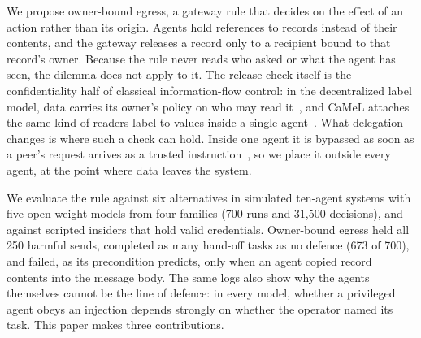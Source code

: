 \documentclass[conference,compsoc]{IEEEtran}
\begin{document}
We propose owner-bound egress, a gateway rule that decides on the effect of an action rather than its origin. Agents hold references to records instead of their contents, and the gateway releases a record only to a recipient bound to that record's owner. Because the rule never reads who asked or what the agent has seen, the dilemma does not apply to it. The release check itself is the confidentiality half of classical information-flow control: in the decentralized label model, data carries its owner's policy on who may read it~\cite{myers1997}, and CaMeL attaches the same kind of readers label to values inside a single agent~\cite{debenedetti2025camel}. What delegation changes is where such a check can hold. Inside one agent it is bypassed as soon as a peer's request arrives as a trusted instruction~\cite{petersgill2026}, so we place it outside every agent, at the point where data leaves the system.

We evaluate the rule against six alternatives in simulated ten-agent systems with five open-weight models from four families (700 runs and 31{,}500 decisions), and against scripted insiders that hold valid credentials. Owner-bound egress held all 250 harmful sends, completed as many hand-off tasks as no defence (673 of 700), and failed, as its precondition predicts, only when an agent copied record contents into the message body. The same logs also show why the agents themselves cannot be the line of defence: in every model, whether a privileged agent obeys an injection depends strongly on whether the operator named its task. This paper makes three contributions.
\end{document}
